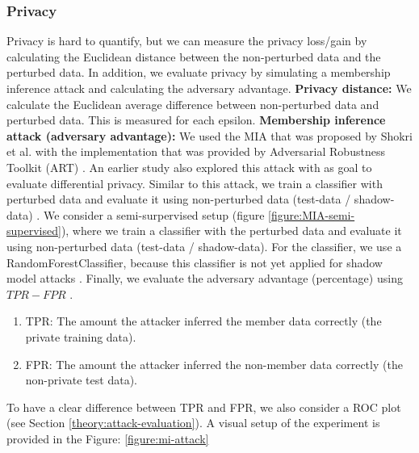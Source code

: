\subsubsection{Privacy}
Privacy is hard to quantify, but we can measure the privacy loss/gain by calculating the Euclidean distance between the non-perturbed data and the perturbed data.
In addition, we evaluate privacy by simulating a membership inference attack and calculating the adversary advantage. \newline
\textbf{Privacy distance:} We calculate the Euclidean average difference between non-perturbed data and perturbed data.
This is measured for each epsilon. \newline
\textbf{Membership inference attack (adversary advantage):}
%
We used the MIA that was proposed by Shokri et al. with the implementation that was provided by Adversarial Robustness Toolkit (ART) \citep{nicolae_adversarial_2019}.
An earlier study also explored this attack with as goal to evaluate differential privacy.
Similar to this attack, we train a classifier with perturbed data and evaluate it using non-perturbed data (test-data / shadow-data) \citep{zhao_not_2020}.
We consider a semi-surpervised setup (figure \ref{figure:MIA-semi-supervised}), where we train a classifier with the perturbed data and evaluate it using non-perturbed data (test-data / shadow-data).
For the classifier, we use a RandomForestClassifier, because this classifier is not yet applied for shadow model attacks \citep{rigaki_survey_2021}.
Finally, we evaluate the adversary advantage (percentage) using $TPR - FPR$ \citep{yeom_privacy_2018}.
\begin{enumerate}
  \item TPR: The amount the attacker inferred the member data correctly (the private training data).
  \item FPR: The amount the attacker inferred the non-member data correctly (the non-private test data).
\end{enumerate}
To have a clear difference between TPR and FPR, we also consider a ROC plot (see Section \ref{theory:attack-evaluation}).
A visual setup of the experiment is provided in the Figure: \ref{figure:mi-attack}

